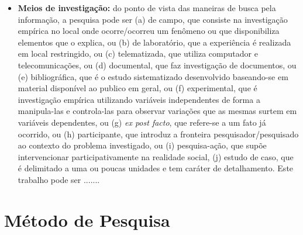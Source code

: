 \begin{itemize}
	\item \textbf{Meios de investigação:} do ponto de vista das maneiras de busca pela informação, a pesquisa pode ser (a) de campo, que consiste na investigação empírica no local onde ocorre/ocorreu um fenômeno ou que disponibiliza elementos que o explica, ou (b) de laboratório, que a experiência é realizada em local restringido, ou (c) telematizada, que utiliza computador e telecomunicações, ou (d) documental, que faz investigação de documentos, ou (e) bibliográfica, que é o estudo sistematizado desenvolvido baseando-se em material disponível ao publico em geral, ou (f) experimental, que é investigação empírica utilizando variáveis independentes de forma a manipula-las e controla-las para observar variações que as mesmas surtem em variáveis dependentes, ou (g) \textit{ex post facto}, que refere-se a um fato já ocorrido, ou (h) participante, que introduz a fronteira pesquisador/pesquisado ao contexto do problema investigado, ou (i) pesquisa-ação, que supõe intervencionar participativamente na realidade social, (j) estudo de caso, que é delimitado a uma ou poucas unidades e tem caráter de detalhamento. Este trabalho pode ser .......
	
\end{itemize}

\section{Método de Pesquisa}

